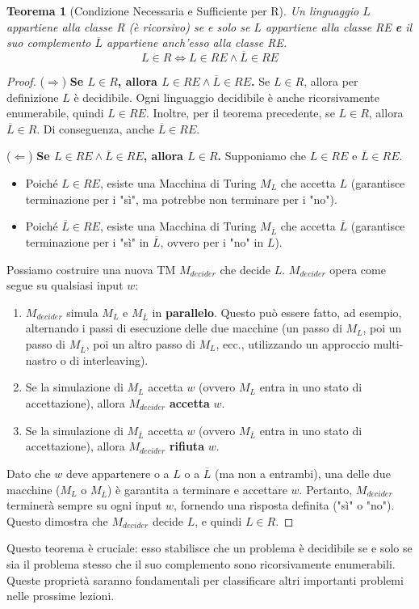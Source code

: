 \documentclass[a4paper]{article}
\newtheorem{theorem}{Teorema}
\begin{document}
\begin{theorem}[Condizione Necessaria e Sufficiente per R]
Un linguaggio $L$ appartiene alla classe R (è ricorsivo) se e solo se $L$ appartiene alla classe RE \textbf{e} il suo complemento $\overline{L}$ appartiene anch'esso alla classe RE.
\[ L \in R \iff L \in RE \land \overline{L} \in RE \]
\end{theorem}
\begin{proof}
($\Rightarrow$) \textbf{Se $L \in R$, allora $L \in RE \land \overline{L} \in RE$.}
Se $L \in R$, allora per definizione $L$ è decidibile. Ogni linguaggio decidibile è anche ricorsivamente enumerabile, quindi $L \in RE$.
Inoltre, per il teorema precedente, se $L \in R$, allora $\overline{L} \in R$. Di conseguenza, anche $\overline{L} \in RE$.

($\Leftarrow$) \textbf{Se $L \in RE \land \overline{L} \in RE$, allora $L \in R$.}
Supponiamo che $L \in RE$ e $\overline{L} \in RE$.
\begin{itemize}
    \item Poiché $L \in RE$, esiste una Macchina di Turing $M_L$ che accetta $L$ (garantisce terminazione per i "sì", ma potrebbe non terminare per i "no").
    \item Poiché $\overline{L} \in RE$, esiste una Macchina di Turing $M_{\overline{L}}$ che accetta $\overline{L}$ (garantisce terminazione per i "sì" in $\overline{L}$, ovvero per i "no" in $L$).
\end{itemize}
Possiamo costruire una nuova TM $M_{decider}$ che decide $L$. $M_{decider}$ opera come segue su qualsiasi input $w$:
\begin{enumerate}
    \item $M_{decider}$ simula $M_L$ e $M_{\overline{L}}$ in \textbf{parallelo}. Questo può essere fatto, ad esempio, alternando i passi di esecuzione delle due macchine (un passo di $M_L$, poi un passo di $M_{\overline{L}}$, poi un altro passo di $M_L$, ecc., utilizzando un approccio multi-nastro o di interleaving).
    \item Se la simulazione di $M_L$ accetta $w$ (ovvero $M_L$ entra in uno stato di accettazione), allora $M_{decider}$ \textbf{accetta} $w$.
    \item Se la simulazione di $M_{\overline{L}}$ accetta $w$ (ovvero $M_{\overline{L}}$ entra in uno stato di accettazione), allora $M_{decider}$ \textbf{rifiuta} $w$.
\end{enumerate}
Dato che $w$ deve appartenere o a $L$ o a $\overline{L}$ (ma non a entrambi), una delle due macchine ($M_L$ o $M_{\overline{L}}$) è garantita a terminare e accettare $w$. Pertanto, $M_{decider}$ terminerà sempre su ogni input $w$, fornendo una risposta definita ("sì" o "no"). Questo dimostra che $M_{decider}$ decide $L$, e quindi $L \in R$.
\end{proof}

Questo teorema è cruciale: esso stabilisce che un problema è decidibile se e solo se sia il problema stesso che il suo complemento sono ricorsivamente enumerabili. Queste proprietà saranno fondamentali per classificare altri importanti problemi nelle prossime lezioni.
\end{document}
